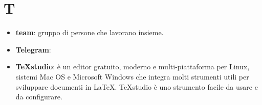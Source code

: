 \section{T}
\begin{itemize}
	\item \textbf{team}: gruppo di persone che lavorano insieme.
	\item \textbf{Telegram}:
	\item \textbf{TeXstudio}: è un editor gratuito, moderno e multi-piattaforma per Linux, sistemi Mac OS e Microsoft Windows che integra molti strumenti utili per sviluppare documenti in \LaTeX. TeXstudio è uno strumento facile da usare e da configurare.
\end{itemize}

